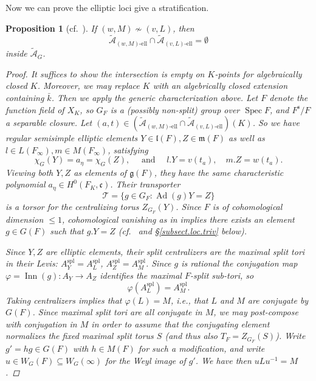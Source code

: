\documentclass[openany]{amsbook}
\newtheorem{proposition}[theorem]{Proposition}
\theoremstyle{definition}
\theoremstyle{remark}
\numberwithin{equation}{section}
\newcommand{\cA}{\mathcal{A}}
\renewcommand{\phi}{\varphi}
\renewcommand{\-}{\operatorname{-}}
\newcommand{\Spec}{\operatorname{Spec}}
\newcommand{\Inn}{\operatorname{Inn}}
\newcommand{\on}[1]{\operatorname{#1}}
\newcommand{\fm}{\mathfrak{m}}
\newcommand{\el}{\text{-ell}}
\newcommand{\ctA}{\widetilde{\cA}}
\newcommand{\ctAe}[2]{\ctA_{(#1, #2)\el}}
\newcommand{\fc}{\mathfrak{c}}
\newcommand{\fl}{\mathfrak{l}}
\renewcommand{\fm}{\mathfrak{m}}
\renewcommand{\fg}{\mathfrak{g}}
\newcommand{\sep}{\text{s}}
\newcommand{\Ad}{\on{Ad}}
\newcommand{\spl}{\mathrm{spl}}
\begin{document}
Now we can prove the elliptic loci give a stratification.
\begin{proposition}[{{cf.\ \cite[\S 3.10]{CLI}}}]\label{prop.base.disjoint}
    If $(w,M) \not\sim (v,L)$, then 
    \[
        \ctAe{w}{M} \cap \ctAe{v}{L} = \emptyset
    \]
    inside $\ctA_{G}$.
    \begin{proof}
        It suffices to show the intersection is empty on $K$-points for algebraically closed $K$. Moreover, we may replace $K$ with an algebrically closed extension containing $\bar{k}$. Then we apply the generic characterization above. Let $F$ denote the function field of $X_{K}$, so $G_F$ is a (possibly non-split) group over $\Spec F$, and $F^{\sep}/F$ a separable closure. Let $(a,t) \in (\ctAe{w}{M} \cap \ctAe{v}{L})(K)$. So we have regular semisimple elliptic elements $Y \in \fl(F), Z \in \fm(F)$ as well as $l \in L(F_{\infty}), m \in M(F_{\infty})$, satisfying
        \[
        \chi_G(Y) = a_{\eta} = \chi_G(Z), \quad \text{ and } \quad l.Y = v(t_a), \quad m.Z = w(t_a).
        \]
        Viewing both $Y,Z$ as elements of $\fg(F)$, they have the same characteristic polynomial $a_{\eta} \in H^0(F_K, \fc)$. Their transporter
        $$
            \mathcal{T} = \{g \in G_F : \Ad(g) Y = Z\}
        $$
        is a torsor for the centralizing torus $Z_{G_F}(Y)$. Since $F$ is of cohomological dimension $\le 1$, cohomological vanishing as in \cite[III.2.3, Thm 1' and Remarks]{serregalcoh} implies there exists an element $g \in G(F)$ such that $g.Y = Z$ (cf.\ \cite[Lemme 3.8.1]{CLI} and \S \ref{subsect.loc.triv} below). 

        Since $Y,Z$ are elliptic elements, their split centralizers are the maximal split tori in their Levis: $A_Y^{\spl} = A_L^{\spl}$, $A_Z^{\spl} = A_M^{\spl}$. Since $g$ is rational the conjugation map $\phi = \Inn(g) : A_Y \to A_Z$ identifies the maximal $F$-split sub-tori, so
        \[
            \phi(A_L^{\spl}) = A_M^{\spl}.
        \]
        Taking centralizers implies that $\phi(L) = M$, i.e., that $L$ and $M$ are conjugate by $G(F)$. Since maximal split tori are all conjugate in $M$, we may post-compose with conjugation in $M$ in order to assume that the conjugating element normalizes the fixed maximal split torus $S$ (and thus also $T_F = Z_{G_F}(S)$). Write $g' = hg \in G(F)$ with $h \in M(F)$ for such a modification, and write $u \in W_G(F) \subseteq W_G(\infty)$ for the Weyl image of $g'$. We have then $u L u^{-1} = M$.
        

\end{proof}
\end{proposition}
\end{document}
